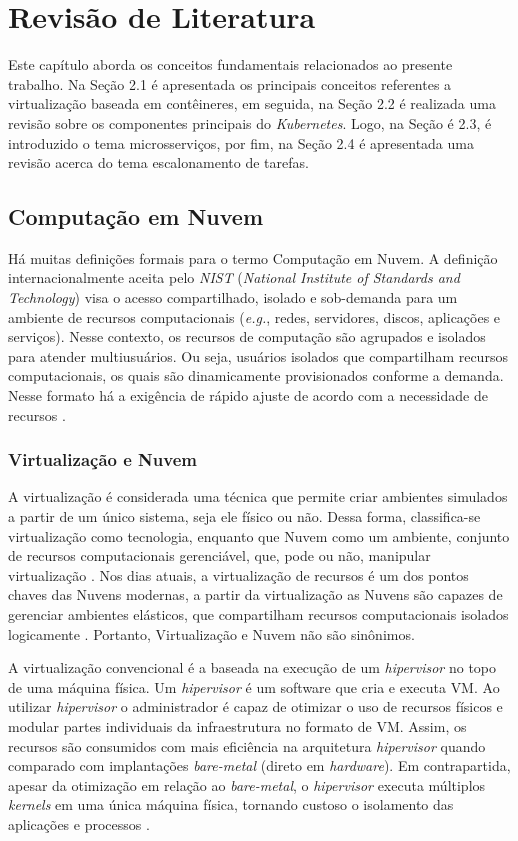 \chapter{Revisão de Literatura}
Este capítulo aborda os conceitos fundamentais relacionados ao presente trabalho. Na Seção 2.1
é apresentada os principais conceitos referentes a virtualização baseada em contêineres, em seguida, na Seção 2.2 é realizada uma revisão sobre os componentes principais do \textit{Kubernetes}. Logo, na Seção é 2.3, é introduzido o tema microsserviços, por fim, na Seção 2.4 é apresentada uma revisão acerca do tema escalonamento de tarefas.

\section {Computação em Nuvem}
Há muitas definições formais para o termo Computação em Nuvem. A definição internacionalmente aceita pelo \textit{NIST} (\textit{National Institute of Standards and Technology})\cite{mell2011nist} visa o acesso compartilhado, isolado e sob-demanda para um ambiente de recursos computacionais (\textit{e.g.}, redes, servidores, discos, aplicações e serviços). Nesse contexto, os recursos de computação são agrupados e isolados para atender multiusuários. Ou seja, usuários isolados que compartilham recursos computacionais, os quais são dinamicamente provisionados conforme a demanda. Nesse formato há a exigência de rápido ajuste de acordo com a necessidade de recursos \cite{Bersten2014}.

\subsection{Virtualização e Nuvem}
A virtualização é considerada uma técnica que permite criar ambientes simulados a partir de um único sistema, seja ele físico ou não. Dessa forma, classifica-se virtualização como tecnologia, enquanto que Nuvem como um ambiente, conjunto de recursos computacionais gerenciável, que, pode ou não, manipular virtualização \cite{Redhat-virtualization-vs-cloud}. Nos dias atuais, a virtualização de recursos é um dos pontos chaves das Nuvens modernas, a partir da virtualização as Nuvens são capazes de gerenciar ambientes elásticos, que compartilham recursos computacionais isolados logicamente \cite{Zhang2010}. Portanto, Virtualização e Nuvem não são sinônimos.

A virtualização convencional é a baseada na execução de um \textit{hipervisor} no topo de uma máquina física. Um \textit{hipervisor} é um software que cria e executa \ac{VM}. Ao utilizar \textit{hipervisor} o administrador é capaz de otimizar o uso de recursos físicos e modular partes individuais da infraestrutura no formato de \ac{VM}. Assim, os recursos são consumidos com mais eficiência na arquitetura \textit{hipervisor} quando comparado com implantações \textit{bare-metal} (direto em \textit{hardware}). Em contrapartida, apesar da otimização em relação ao \textit{bare-metal}, o \textit{hipervisor} executa múltiplos \textit{kernels} em uma única máquina física, tornando custoso o isolamento das aplicações e processos \cite{scheepers2014virtualization}.

